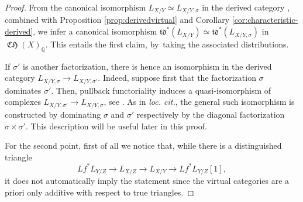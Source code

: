\documentclass[11pt]{article}
\providecommand{\loccit}{\emph{loc. cit.}}
\theoremstyle{plain}
\theoremstyle{definition}
\newcommand{\QBbb}{\mathbb Q}
\newcommand{\tdfrak}{\mathfrak {td}}
\DeclareMathOperator{\CHfrak}{\mathfrak{CH}}
\begin{document}
\begin{proof}
From the canonical isomorphism $L_{X/Y}\simeq L_{X/Y,\sigma}$ in the derived category \cite[\href{https://stacks.math.columbia.edu/tag/08TJ}{08TJ}]{stacks-project}, combined with Proposition \ref{prop:derivedvirtual} and Corollary \ref{cor:characteristic-derived}, we infer a canonical isomorphism
$\tdfrak^{\ast}(L_{X/Y})\simeq \tdfrak^{\ast}(L_{X/Y,\sigma})$ in $\CHfrak(X)_{\QBbb}$. This entails the first claim, by~taking the associated distributions.

If $\sigma'$ is another factorization, there is hence an isomorphism in the derived category $L_{X/Y, \sigma} \to L_{X/Y, \sigma'}$. Indeed, suppose first that the factorization $\sigma$ dominates $\sigma'$. Then, pullback functoriality induces a quasi-isomorphism of complexes $L_{X/Y, \sigma'} \to L_{X/Y, \sigma}$, see \cite[Exp.\,VIII, proof of Prop.\,2.2]{SGA6}. As in \loccit, the general such isomorphism is constructed by dominating $\sigma$ and $\sigma'$ respectively by the diagonal factorization $\sigma \times \sigma'$. This description will be useful later in this proof.

For the second point, first of all we notice that, while there is a distinguished triangle
\begin{displaymath}
Lf^\ast L_{Y/Z} \to L_{X/Z} \to L_{X/Y} \to Lf^\ast L_{Y/Z}[1],
\end{displaymath}
it does not automatically imply the statement since the virtual categories are a priori only additive with respect to true triangles.


\end{proof}
\end{document}
